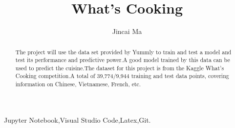 \documentclass{amsart}
\begin{document}
%
%
\title[A Short Running Title]{ What's Cooking}%

\author{Jincai Ma}



%
%
\date{\gitAuthorDate}%

\begin{abstract}
    The project will use the data set provided by Yummly to train and test a model and test its performance and predictive power.A good model trained by this data can be used to predict the cuisine.The dataset for this project is from the Kaggle What's Cooking competition.A total of 39,774/9,944 training and test data points, covering information on Chinese, Vietnamese, French, etc.
    
\end{abstract}

\maketitle
\tableofcontents

\newpage



\newpage




\listoftodos
Jupyter Notebook,Visual Studio Code,Latex,Git.
\end{document}
